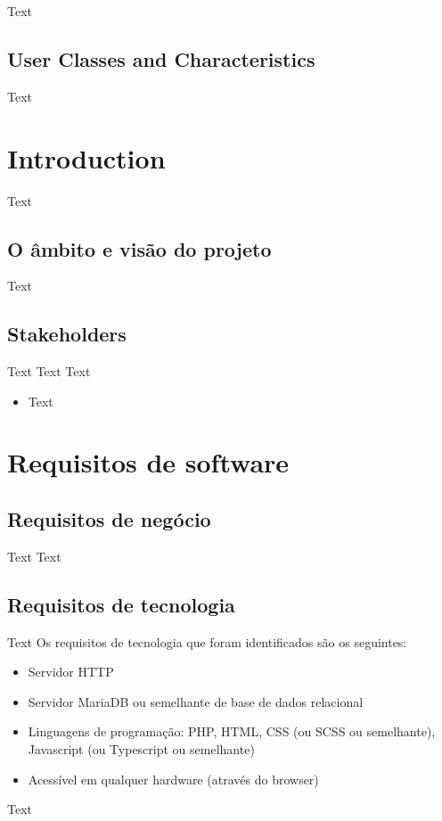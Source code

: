 \documentclass{scrreprt}
\begin{document}
Text

\section{User Classes and Characteristics}

Text

\chapter{Introduction}

Text

\section{O âmbito e visão do projeto}

Text

\section{Stakeholders}

Text
\newline
Text
\newline
Text
\begin{itemize}
    \item Text
\end{itemize}

\chapter{Requisitos de software}

\section{Requisitos de negócio}

Text
\newline
Text

\section{Requisitos de tecnologia}

Text
\newline
Os requisitos de tecnologia que foram identificados são os seguintes:
\begin{itemize}
    \item Servidor HTTP
    \item Servidor MariaDB ou semelhante de base de dados relacional
    \item Linguagens de programação: PHP, HTML, CSS (ou SCSS ou semelhante), Javascript (ou Typescript ou semelhante)
    \item Acessível em qualquer hardware (através do browser)
\end{itemize}
Text
\end{document}
